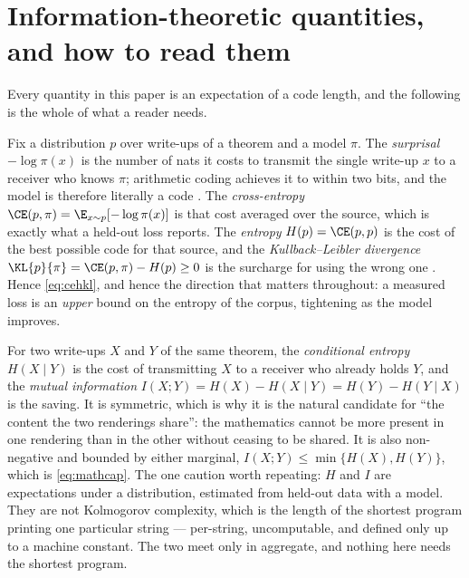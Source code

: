 %

\section{Information-theoretic quantities, and how to read them}
\label{app:info}

Every quantity in this paper is an expectation of a code length, and the
following is the whole of what a reader needs.

Fix a distribution \(p\) over write-ups of a theorem and a model \(\pi\).
The \emph{surprisal} \(-\log \pi(x)\) is the number of nats it costs to
transmit the single write-up \(x\) to a receiver who knows \(\pi\);
arithmetic coding achieves it to within two bits, and the model is therefore
literally a code \citep{deletang2024compression}.
The \emph{cross-entropy} \(\CE(p,\pi) = \E_{x\sim p}[-\log \pi(x)]\) is that
cost averaged over the source, which is exactly what a held-out loss reports.
The \emph{entropy} \(H(p) = \CE(p,p)\) is the cost of the best possible code for
that source, and the \emph{Kullback--Leibler divergence}
\(\KL{p}{\pi} = \CE(p,\pi) - H(p) \ge 0\) is the surcharge for using the wrong
one \citep{cover2006elements}.
Hence \cref{eq:cehkl}, and hence the direction that matters throughout:
a measured loss is an \emph{upper} bound on the entropy of the corpus, tightening
as the model improves.

For two write-ups \(X\) and \(Y\) of the same theorem, the \emph{conditional
entropy} \(H(X\mid Y)\) is the cost of transmitting \(X\) to a receiver who
already holds \(Y\), and the \emph{mutual information}
\(I(X;Y) = H(X) - H(X\mid Y) = H(Y) - H(Y\mid X)\) is the saving.
It is symmetric, which is why it is the natural candidate for ``the content the
two renderings share'':
the mathematics cannot be more present in one rendering than in the other
without ceasing to be shared.
It is also non-negative and bounded by either marginal, \(I(X;Y) \le
\min\{H(X), H(Y)\}\), which is \cref{eq:mathcap}.
The one caution worth repeating:
\(H\) and \(I\) are expectations under a distribution, estimated from held-out
data with a model.
They are not Kolmogorov complexity, which is the length of the shortest program
printing one particular string --- per-string, uncomputable, and defined only up
to a machine constant.
The two meet only in aggregate, and nothing here needs the shortest program.

